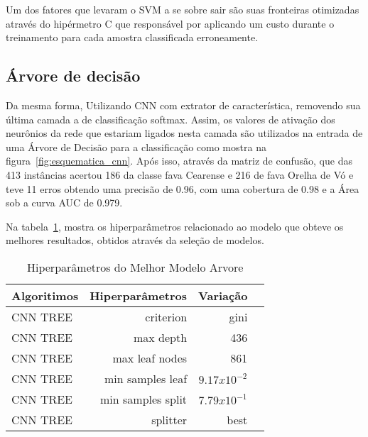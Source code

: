 Um dos fatores que levaram o SVM a se sobre sair são suas fronteiras otimizadas através do hipérmetro C que responsável por aplicando um custo durante o treinamento para cada amostra classificada erroneamente.

\subsection{Árvore de decisão}

Da mesma forma, Utilizando CNN com extrator de característica, removendo sua última camada a de classificação softmax. Assim, os valores de ativação dos neurônios da rede que estariam ligados nesta camada são utilizados na entrada de uma Árvore de Decisão para a classificação como mostra na figura~\ref{fig:esquematica_cnn}. Após isso, através da matriz de confusão, que das 413 instâncias acertou 186 da classe fava Cearense e 216 de fava Orelha de Vó e teve 11 erros obtendo uma precisão de 0.96, com uma cobertura de 0.98 e a Área sob a curva AUC de 0.979.


Na tabela~\ref{tabela:hiperparametros_best_models_tree}, mostra os hiperparâmetros relacionado ao modelo que obteve os melhores resultados, obtidos através da seleção de modelos.

\begin{table}[H]
\centering
\caption{Hiperparâmetros do Melhor Modelo Arvore}
\label{tabela:hiperparametros_best_models_tree}
\def\arraystretch{1.2}
\begin{tabular}{@{}lrrr@{}}
\toprule
{\textbf{Algoritimos}} & {\textbf{Hiperparâmetros}} & {\textbf{Variação}}  \\
\midrule
CNN TREE & criterion & gini \\ 
CNN TREE & max depth &   436 \\ 
CNN TREE & max leaf nodes & 861 \\ 
CNN TREE & min samples leaf & $9.17x10^{-2}$ \\ %
CNN TREE & min samples split & $7.79x10^{-1}$ \\ %
CNN TREE & splitter & best \\ 
\bottomrule
\end{tabular}
\end{table}

